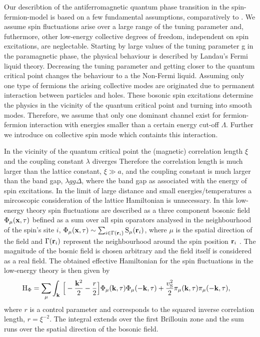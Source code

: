 Our describtion of the antiferromagnetic quantum phase transition in the spin-fermion-model is based on a few fundamental assumptions, comparatively to \cite{Abanov&Chubukov&Schmalian}.
We assume spin fluctuations arise over a large range of the tuning parameter and, futhermore, other low-energy collective degrees of freedom, independent on spin excitations, are neglectable.
Starting by large values of the tuning parameter g in the paramagnetic phase, the physical behaviour is described by Landau's Fermi liquid theory.
Decreasing the tuning parameter and getting closer to the quantum critical point changes the behaviour to a the Non-Fermi liquid.
Assuming only one type of fermions the arising collective modes are originated due to permanent interaction between particles and holes.
These bosonic spin excitations determine the physics in the vicinity of the quantum critical point and turning into smooth modes.
Therefore, we assume that only one dominant channel exist for fermion-fermion interaction with energies smaller than a certain energy cut-off $\Lambda$.
Further we introduce on collective spin mode which containts this interaction.

In the vicinity of the quantum critical point the (magnetic) correlation length $\xi$ and the coupling constant $\lambda$ diverges
Therefore the correlation length is much larger than the lattice constant, $\xi \gg a$, and the coupling constant is much larger than the band gap, $\lambda gg \Delta$, where the band gap as associated with the energy of spin excitations.
In the limit of large distance and small energies/temperatures a mircoscopic consideration of the lattice Hamiltonian is unnecessary.
In this low-energy theory spin fluctuations are described as a three component bosonic field $\Phi_{\mu}(\vb{x}, \tau)$ befined as a sum over all spin oparators analysed in the neighbourhood of the spin's site $i$, $\Phi_{\mu}(\vb{x}, \tau) \sim \sum_{i \in \Gamma(\vb{r}_{i})} \mathrm{S}_{\mu}(\vb{r}_{i})$, where $\mu$ is the spatial direction of the field and $\Gamma(\vb{r}_{i})$ represent the neighbourhood around the spin position $\vb{r}_{i}$ \cite{SachdevQCP}.
The magnitude of the bosnic field is chosen arbitrary and the field itself is considered as a real field.
The obtained effective Hamiltonian for the spin fluctuations in the low-energy theory is then given by
%
\begin{align}
	\mathrm{H}_{\Phi} &= 
	 	\sum\limits_{\mu} \int_{\vb{k}}\, \Big[
	 	-\frac{\vb{k}^{2}}{2} - \frac{r}{2}\Big] \Phi_{\mu}(\vb{k},\tau) \Phi_{\mu}(-\vb{k},\tau)
		+
		\frac{v_{\mathrm{S}}^{2}}{2} \pi_{\mu}(\vb{k},\tau) \pi_{\mu}(-\vb{k},\tau),
	\label{eq:Hamiltonian spin fluctuation}
\end{align}
%
where $r$ is a control parameter and corresponds to the squared inverse correlation length, $r = \xi^{-2}$.
The integral extends over the first Brillouin zone and the sum runs over the spatial direction of the bosonic field.

